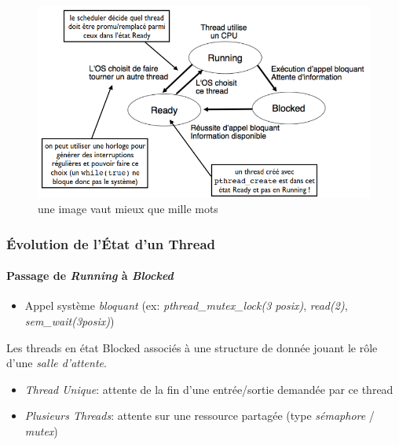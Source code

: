 \begin{figure}
\centering
\includegraphics{image-29.png}
\caption{une image vaut mieux que mille mots}
\end{figure}

\subsubsection{Évolution de l'État d'un
Thread}\label{uxe9volution-de-luxe9tat-dun-thread}

\paragraph{\texorpdfstring{Passage de \emph{Running} à
\emph{Blocked}}{Passage de Running à Blocked}}\label{passage-de-running-uxe0-blocked}

\begin{itemize}
\tightlist
\item
  Appel système \emph{bloquant} (ex: \emph{pthread\_mutex\_lock(3
  posix)}, \emph{read(2)}, \emph{sem\_wait(3posix)})
\end{itemize}

Les threads en état Blocked associés à une structure de donnée jouant le
rôle d'une \emph{salle d'attente}.

\begin{itemize}
\tightlist
\item
  \emph{Thread Unique}: attente de la fin d'une entrée/sortie demandée
  par ce thread
\item
  \emph{Plusieurs Threads}: attente sur une ressource partagée (type
  \emph{sémaphore} / \emph{mutex})
\end{itemize}

